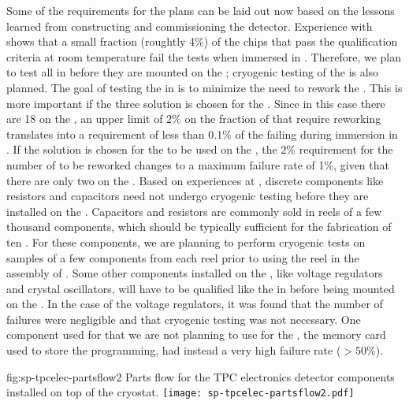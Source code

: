 Some of the requirements for the  plans can
be laid out now based on the lessons learned
from constructing and commissioning the 
detector. Experience with  shows that a small fraction
(roughtly \num{4}\%) of the  chips that pass the
qualification criteria at room temperature fail the tests
when immersed in \lntwo. Therefore, we plan to test all  in \lntwo
before they are mounted on the ; 
cryogenic testing of the  is also planned. The goal of testing 
the  in \lntwo is to minimize the need
to rework the . This is more important if 
the three  solution is chosen for the
. Since in this case there are 18  on the
, an upper limit of 2\% on the fraction of
 that require reworking translates into a requirement 
of less than 0.1\% of the  failing during immersion in \lntwo.
If the  solution is chosen for the 
to be used on the , the 2\% requirement for the
number of  to be reworked changes to a 
maximum failure rate of 1\%, given that there are only two
 on the . Based on experiences at ,
discrete components like resistors and capacitors
need not undergo cryogenic testing before they are installed
on the . Capacitors and resistors are commonly
sold in reels of a few thousand components, which
should be typically sufficient for the fabrication of ten
. For these components, we are planning to
perform cryogenic tests on samples of a few components
from each reel prior to using the reel in the assembly of
. Some other components installed on
the , like voltage regulators and crystal oscillators, 
will have to be qualified like the 
in \lntwo before being mounted on the . In the
case of the voltage regulators, it was found that the number
of failures were negligible and that cryogenic testing was
not necessary. One component used for 
that we are not planning to use for the   ,
the memory card used to store the  programming,
had instead a very high failure rate ($>50$\%).

\begin{dunefigure}
{fig:sp-tpcelec-partsflow2}
{Parts flow for the TPC electronics detector components installed on top of the cryostat.}
\texttt{[image: sp-tpcelec-partsflow2.pdf]}
\end{dunefigure}

